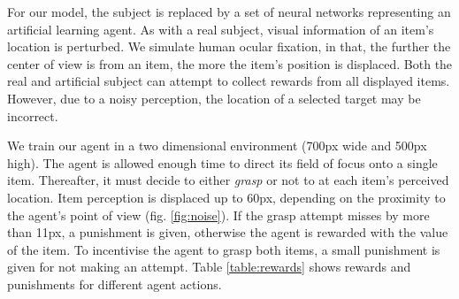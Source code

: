 \documentclass[11]{article}
\begin{document}
For our model, the subject is replaced by a set of neural networks representing an artificial learning agent. 
As with a real subject, visual information of an item's location is perturbed. 
We simulate human ocular fixation, in that, the further the center of view is from an item, the more the item's position is displaced. 
Both the real and artificial subject can attempt to collect rewards from all displayed items. 
However, due to a noisy perception, the location of a selected target may be incorrect. 

We train our agent in a two dimensional environment (700px wide and 500px high). 
The agent is allowed enough time to direct its field of focus onto a single item.
Thereafter, it must decide to either \textit{grasp} or not to at each item's perceived location.
Item perception is displaced up to 60px, depending on the proximity to the agent's point of view (fig. \ref{fig:noise}).
If the grasp attempt misses by more than 11px, a punishment is given, otherwise the agent is rewarded with the value of the item. 
To incentivise the agent to grasp both items, a small punishment is given for not making an attempt.
Table \ref{table:rewards} shows rewards and punishments for different agent actions.
\end{document}
